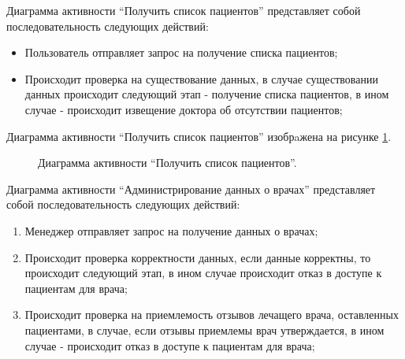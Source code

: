 \documentclass[14pt]{extreport}
\begin{document}
        Диаграмма активности  “Получить список пациентов” представляет собой %
        последовательность следующих действий:

        \begin{itemize}
            \item Пользователь отправляет запрос на получение списка пациентов;
            \item Происходит проверка на существование данных, в случае %
            существовании данных происходит следующий этап - получение списка %
            пациентов, в ином случае - происходит извещение доктора об отсутствии пациентов;
        \end{itemize}
        
        Диаграмма активности  “Получить список пациентов” изобрaжена на рисунке \ref{diagram-patient-list}.

        \begin{figure}[H]%
            \centering
            \caption{Диаграмма активности  “Получить список пациентов”.} \label{diagram-patient-list}
        \end{figure} 

        Диаграмма активности “Администрирование данных о врачах” %
        представляет собой последовательность следующих действий:
        \begin{enumerate}
            \item Менеджер отправляет запрос на получение данных о врачах;
            \item Происходит проверка корректности данных, если данные %
            корректны, то происходит следующий этап, в ином случае происходит %
            отказ в доступе к пациентам для врача;
            \item Происходит проверка на приемлемость отзывов лечащего врача, %
            оставленных пациентами, в случае, если отзывы приемлемы врач %
            утверждается, в ином случае - происходит отказ в доступе к пациентам %
            для врача;
        \end{enumerate}
        
\end{document}
